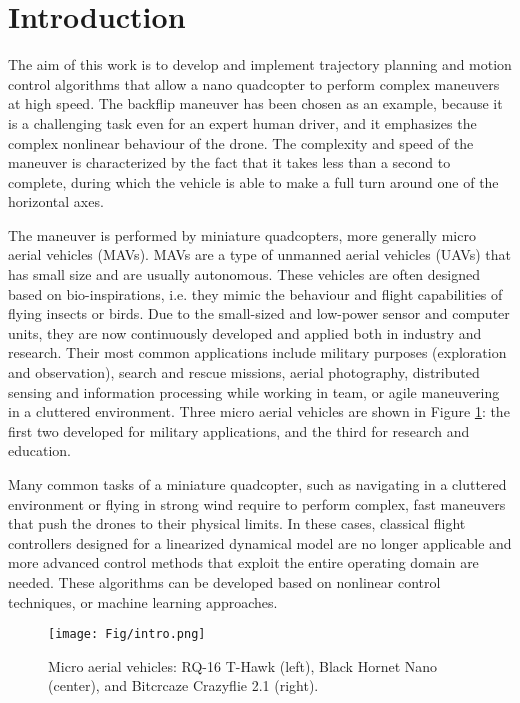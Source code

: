 \section{Introduction}
The aim of this work is to develop and implement trajectory planning and motion control algorithms that allow a nano quadcopter to perform complex maneuvers at high speed. The backflip maneuver has been chosen as an example, because it is a challenging task even for an expert human driver, and it emphasizes the complex nonlinear behaviour of the drone. The complexity and speed of the maneuver is characterized by the fact that it takes less than a second to complete, during which the vehicle is able to make a full turn around one of the horizontal axes.

The maneuver is performed by miniature quadcopters, more generally micro aerial vehicles (MAVs). MAVs are a type of unmanned aerial vehicles (UAVs) that has small size and are usually autonomous. These vehicles are often designed based on bio-inspirations, i.e. they mimic the behaviour and flight capabilities of flying insects or birds. Due to the small-sized and low-power sensor and computer units, they are now continuously developed and applied both in industry and research. Their most common applications include military purposes (exploration and observation), search and rescue missions, aerial photography, distributed sensing and information processing while working in team, or agile maneuvering in a cluttered environment. Three micro aerial vehicles are shown in Figure \ref{fig:intro}: the first two developed for military applications, and the third for research and education.

Many common tasks of a miniature quadcopter, such as navigating in a cluttered environment or flying in strong wind require to perform complex, fast maneuvers that push the drones to their physical limits. In these cases, classical flight controllers designed for a linearized dynamical model are no longer applicable and more advanced control methods that exploit the entire operating domain are needed. These algorithms can be developed based on nonlinear control techniques, or machine learning approaches.

\begin{figure}[b]
    \centering
    \texttt{[image: Fig/intro.png]}
    \caption[Micro aerial vehicles]{Micro aerial vehicles: RQ-16 T-Hawk (left), Black Hornet Nano (center), and Bitcrcaze Crazyflie 2.1 (right).}
    \label{fig:intro}
\end{figure}

